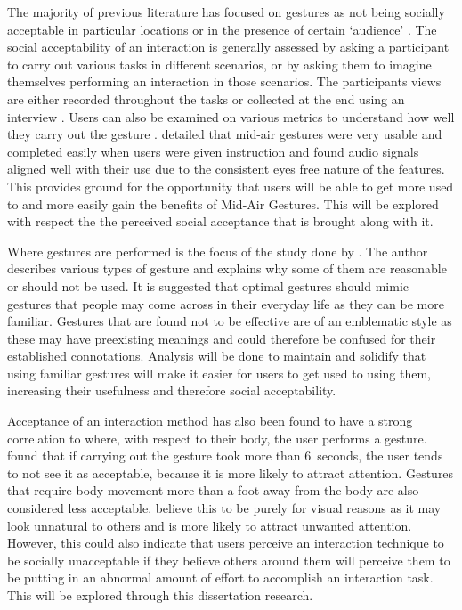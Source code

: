 \documentclass{l4proj}
\begin{document}
The majority of previous literature has focused on gestures as not being socially acceptable in particular locations or in the presence of certain `audience' \citep{rico_usable_2010}. The social acceptability of an interaction is generally assessed by asking a participant to carry out various tasks in different scenarios, or by asking them to imagine themselves performing an interaction in those scenarios. The participants views are either recorded throughout the tasks \citep{ahlstrom_are_2014} or collected at the end using an interview \citep{rico_usable_2010}. Users can also be examined on various metrics to understand how well they carry out the gesture \citep{freeman_rhythmic_2017}. \citet{freeman_rhythmic_2017} detailed that mid-air gestures were very usable and completed easily when users were given instruction and found audio signals aligned well with their use due to the consistent eyes free nature of the features. This provides ground for the opportunity that users will be able to get more used to and more easily gain the benefits of Mid-Air Gestures. This will be explored with respect the the perceived social acceptance that is brought along with it.

Where gestures are performed is the focus of the study done by \citet{rico_usable_2010}. The author describes various types of gesture and explains why some of them are reasonable or should not be used. It is suggested that optimal gestures should mimic gestures that people may come across in their everyday life as they can be more familiar. Gestures that are found not to be effective are of an emblematic style as these may have preexisting meanings and could therefore be confused for their established connotations. Analysis will be done to maintain and solidify that using familiar gestures will make it easier for users to get used to using them, increasing their usefulness and therefore social acceptability.

Acceptance of an interaction method has also been found to have a strong correlation to where, with respect to their body, the user performs a gesture. \citet{ahlstrom_are_2014} found that if carrying out the gesture took more than 6~seconds, the user tends to not see it as acceptable, because it is more likely to attract attention. Gestures that require body movement more than a foot away from the body are also considered less acceptable. \citet{ahlstrom_are_2014} believe this to be purely for visual reasons as it may look unnatural to others and is more likely to attract unwanted attention. However, this could also indicate that users perceive an interaction technique to be socially unacceptable if they believe others around them will perceive them to be putting in an abnormal amount of effort to accomplish an interaction task. This will be explored through this dissertation research.
\end{document}
